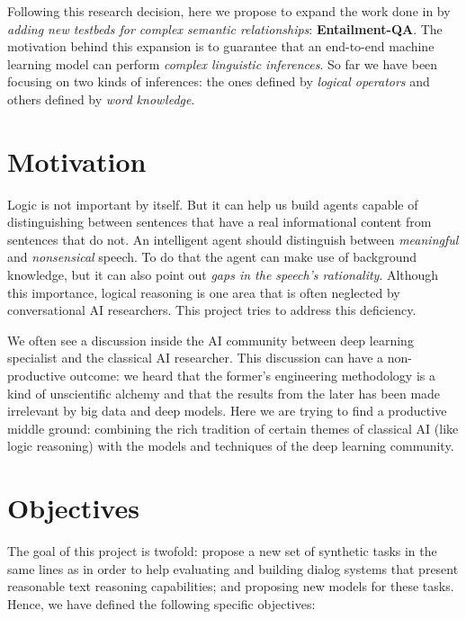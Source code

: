 Following this research decision, here we propose to expand the work done in \cite{BordesW16, WestonBCM15} by \textit{adding new testbeds for complex semantic relationships}: \textbf{Entailment-QA}. The motivation behind this expansion is to guarantee that an end-to-end machine learning model can perform \textit{complex linguistic inferences}. So far we have been focusing on two kinds of inferences: the ones defined by \textit{logical operators} and others defined by \textit{word knowledge}.


\section{Motivation}
\label{sec:motivation}

Logic is not important by itself. But it can help us build agents capable of distinguishing between sentences that have a real informational content from sentences that do not. An intelligent agent should distinguish between \textit{meaningful} and \textit{nonsensical} speech. To do that the agent can make use of background knowledge, but it can also point out \textit{gaps in the speech's rationality}. Although this importance, logical reasoning is one area that is often neglected by conversational AI researchers. This project tries to address this deficiency.

We often see a discussion inside the AI community between deep learning specialist and the classical AI researcher. This discussion can have a non-productive outcome: we heard that the former's engineering methodology is a kind of unscientific alchemy and that the results from the later has been made irrelevant by big data and deep models. Here we are trying to find a productive middle ground: combining the rich tradition of certain themes of classical AI (like logic reasoning) with the models and techniques of the deep learning community.

\section{Objectives}
\label{sec:objectives}

The goal of this project is twofold:  propose a new set of synthetic tasks in the same lines as \cite{WestonBCM15} in order to help evaluating and building dialog systems that present reasonable text reasoning capabilities;  and proposing new models for these tasks. Hence, we have defined the following specific objectives:

